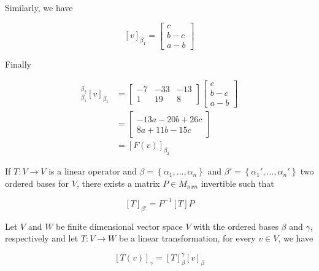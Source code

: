 \documentclass{report}
\begin{document}
\begin{Example}
\begin{enumerate}
            Similarly, we have

            $$[v]_{\beta_1} = \begin{bmatrix}
                c \\ b - c \\ a - b
            \end{bmatrix}$$

            Finally

            \begin{align*}
                [F]_{\beta_1}^{\beta_2}[v]_{\beta_1} &=
                \begin{bmatrix}
                    -7 & -33 & -13 \\
                    1 & 19 & 8
                \end{bmatrix} \begin{bmatrix}
                    c \\
                    b - c \\
                    a - b
                \end{bmatrix} \\
                &= \begin{bmatrix}
                    -13a - 20b + 26c \\
                    8a + 11b - 15c
                \end{bmatrix} \\
                &= [F(v)]_{\beta_2}
            \end{align*}
        \end{enumerate}
    \end{Example}

    \begin{thBox}
        If $T: V \to V$ is a linear operator and $\beta = \left\{ \alpha_1, \dots , \alpha_n \right\}$ and $\beta' = \left\{ \alpha_1', \dots , \alpha_n' \right\}$ two ordered bases for $V$, there exists a matrix $P \in M_{nxn}$ invertible such that

        $$[T]_{\beta'} = P^{-1}[T]P$$
    \end{thBox}

    \begin{thBox}
        Let $V$ and $W$ be finite dimensional vector space $V$ with the ordered bases $\beta$ and $\gamma$, respectively and let $T: V \to W$ be a linear transformation, for every $v \in V$, we have

        $$[T(v)]_\gamma = [T]_\beta^\gamma[v]_\beta$$
    \end{thBox}
\end{document}
